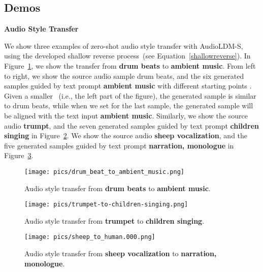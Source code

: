 \documentclass{article}
\begin{document}
\newpage
\subsection{Demos}
\label{app:demos}

\textbf{Audio Style Transfer}

We show three examples of zero-shot audio style transfer with AudioLDM-S, using the developed shallow reverse process~(see Equation~\ref{shallowreverse}). In Figure~\ref{fig:demo-style-transfer-1}, we show the transfer from \textbf{drum beats} to \textbf{ambient music}. From left to right, we show the source audio sample drum beats, and the six generated samples guided by text prompt \textbf{ambient music} with different starting points . Given a smaller ~(i.e., the left part of the figure), the generated sample is similar to drum beats, while when we set  for the last sample, the generated sample will be aligned with the text input \textbf{ambient music}. Similarly, we show the source audio \textbf{trumpt}, and the seven generated samples guided by text prompt \textbf{children singing} in Figure~\ref{fig:demo-style-transfer-2}. We show the source audio \textbf{sheep vocalization}, and the five generated samples guided by text prompt \textbf{narration, monologue} in Figure~\ref{fig:demo-style-transfer-3}.

\vspace{0.5cm}

\begin{figure}[htbp]
    \centering
    \texttt{[image: pics/drum\_beat\_to\_ambient\_music.png]}
    \caption{Audio style transfer from \textbf{drum beats} to \textbf{ambient music}.}
    \label{fig:demo-style-transfer-1}
\end{figure}

\begin{figure}[htbp]
    \centering
    \texttt{[image: pics/trumpet-to-children-singing.png]}
    \caption{Audio style transfer from \textbf{trumpet} to \textbf{children singing}.}
    \label{fig:demo-style-transfer-2}
\end{figure}


\begin{figure}[htbp]
    \centering
    \texttt{[image: pics/sheep\_to\_human.000.png]}
    \caption{Audio style transfer from \textbf{sheep vocalization} to \textbf{narration, monologue}.}
    \label{fig:demo-style-transfer-3}
\end{figure}
\end{document}
